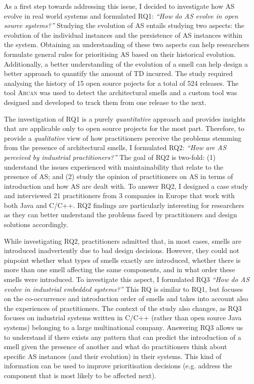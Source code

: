 As a first step towards addressing this issue, I decided to investigate how AS evolve in real world systems and formulated RQ1: \textit{``How do AS evolve in open source systems?''} 
Studying the evolution of AS entails studying two aspects: the evolution of the individual instances and the persistence of AS instances within the system.
Obtaining an understanding of these two aspects can help researchers formulate general rules for prioritising AS based on their historical evolution.
Additionally, a better understanding of the evolution of a smell can help design a better approach to quantify the amount of TD incurred.
The study required analysing the history of 15 open source pojects for a total of 524 releases.
The tool \textsc{Arcan} was used to detect the architectural smells and a custom tool was designed and developed to track them from one release to the next.

The investigation of RQ1 is a purely \emph{quantitative} approach and provides insights that are applicable only to open source projects for the most part.
Therefore, to provide a \emph{qualitative} view of how practitioners perceive the problems stemming from the presence of architectural smells, I formulated RQ2: \textit{``How are AS perceived by industrial practitioners?''}
The goal of RQ2 is two-fold: (1) understand the issues experienced with maintainability that relate to the presence of AS; and (2) study the opinion of practitioners on AS in terms of introduction and how AS are dealt with.
To answer RQ2, I designed a case study and interviewed 21 practitioners from 3 companies in Europe that work with both Java and C/C++.
RQ2 findings are particularly interesting for researchers as they can better understand the problems faced by practitioners and design solutions accordingly.

While investigating RQ2, practitioners admitted that, in most cases, smells are introduced inadvertently due to bad design decisions.
However, they could not pinpoint whether what types of smells exactly are introduced, whether there is more than one smell affecting the same components, and in what order these smells were introduced.
To investigate this aspect, I formulated RQ3 \textit{``How do AS evolve in industrial embedded systems?''}
This RQ is similar to RQ1, but focuses on the co-occurrence and introduction order of smells and takes into account also the experiences of practitioners.
The context of the study also changes, as RQ3 focuses on industrial systems written in C/C++ (rather than open source Java systems) belonging to a large multinational company.
Answering RQ3 allows us to understand if there exists any pattern that can predict the introduction of a smell given the presence of another and what do practitioners think about specific AS instances (and their evolution) in their systems.
This kind of information can be used to improve prioritisation decisions (e.g. address the component that is most likely to be affected next).

